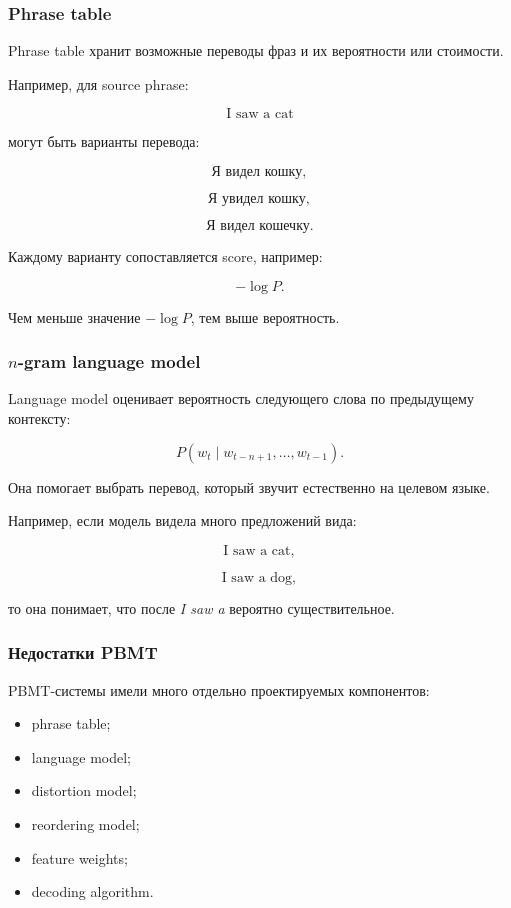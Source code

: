 \documentclass[a4paper,12pt]{article}
\begin{document}
\subsubsection{Phrase table}

Phrase table хранит возможные переводы фраз и их вероятности или стоимости.

Например, для source phrase:

\[
\text{I saw a cat}
\]

могут быть варианты перевода:

\[
\text{Я видел кошку},
\]

\[
\text{Я увидел кошку},
\]

\[
\text{Я видел кошечку}.
\]

Каждому варианту сопоставляется score, например:

\[
-\log P.
\]

Чем меньше значение \(-\log P\), тем выше вероятность.

\subsubsection{\texorpdfstring{\(n\)-gram}{n-gram} language model}

Language model оценивает вероятность следующего слова по предыдущему контексту:

\[
P(w_t \mid w_{t-n+1}, \dots, w_{t-1}).
\]

Она помогает выбрать перевод, который звучит естественно на целевом языке.

Например, если модель видела много предложений вида:

\[
\text{I saw a cat},
\]

\[
\text{I saw a dog},
\]

то она понимает, что после \textit{I saw a} вероятно существительное.

\subsubsection{Недостатки PBMT}

PBMT-системы имели много отдельно проектируемых компонентов:

\begin{itemize}
    \item phrase table;
    \item language model;
    \item distortion model;
    \item reordering model;
    \item feature weights;
    \item decoding algorithm.
\end{itemize}
\end{document}
